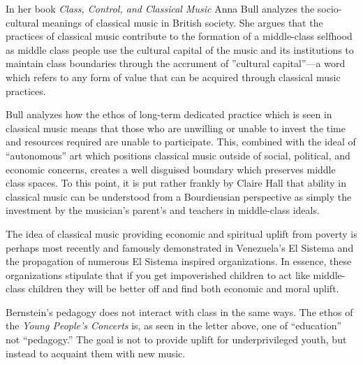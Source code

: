 \documentclass[12pt,letterpaper]{article}
\begin{document}
	In her book \textit{Class, Control, and Classical Music} Anna Bull 
	analyzes the socio-cultural meanings of classical music in British
	society. She argues that the practices of classical music contribute to
	the formation of a middle-class selfhood as middle class people use the
	cultural capital of the music and its institutions to maintain class
	boundaries through the accrument of ''cultural capital''---a word which
	refers to any form of value that can be acquired through classical music 
	practices.\autocite[4]{Bull}\autocite[3]{Bull}

	Bull analyzes how the ethos of long-term dedicated practice which is 
	seen in classical music means that those who are unwilling or unable to
	invest the time and resources required are unable to participate.
	This, combined with the ideal of ``autonomous'' art which 
	positions classical music outside of social, political, and economic 
	concerns, creates a well disguised boundary which preserves middle 
	class spaces.\autocite[6]{Bull} To this point, it is put rather frankly
	 by Claire Hall that ability in classical music can be 
	understood from a Bourdieusian perspective as simply the investment by 
	the musician's parent's and teachers in middle-class 
	ideals.\autocite[7]{Bull}

	The idea of classical music providing economic and spiritual uplift from
	poverty is perhaps most recently and famously demonstrated in 
	Venezuela's El Sistema and the propagation of numerous El Sistema 
	inspired organizations.  In essence, these organizations stipulate that
	if you get impoverished children to act like middle-class children they
	will be better off and find both economic and moral uplift.  

	Bernstein's pedagogy does not interact with class in the same ways. 
	The ethos of the \textit{Young People's Concerts} is, as seen in the
	letter above, one of ``education'' not ``pedagogy.'' 
	The goal is not to provide uplift for
	underprivileged youth, but instead to acquaint them with new music.   
\end{document}
